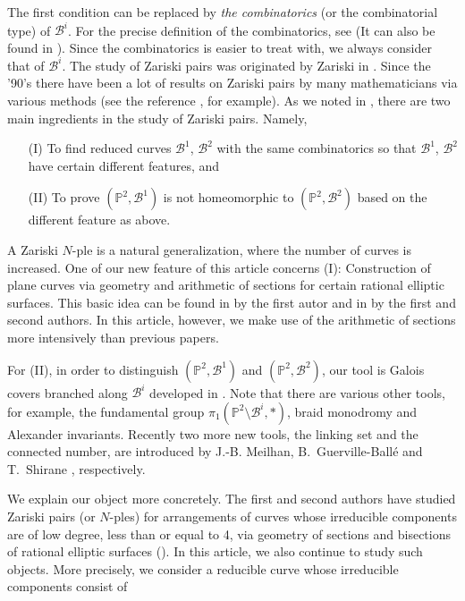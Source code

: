 \documentclass{article}
\newcommand{\PP}{\mathbb P}
\newcommand{\mcB}{\mathcal B}
\begin{document}
The first condition can be replaced by {\it the combinatorics} (or {the combinatorial type}) of $\mcB^i$. For the precise definition
of the combinatorics,  see \cite{act} (It can also be found in \cite{tokunaga14}).  Since the combinatorics is easier to
treat with, we always consider that of $\mcB^i$.
The study of Zariski pairs was originated by Zariski in \cite{zariski29}. Since the '90's there have been
a lot of results on Zariski pairs by many mathematicians via various methods (see the reference \cite{act},
for example).
As we noted in \cite{act}, there are two main ingredients in the study of Zariski pairs.
Namely,
\begin{enumerate}

\item[(I)] To find reduced curves $\mcB^1$, $\mcB^2$ with the same combinatorics so that $\mcB^1$, $\mcB^2$ have
certain different features, and

\item[(II)] To prove $(\PP^2, \mcB^1)$ is not homeomorphic to $(\PP^2, \mcB^2)$ based on the different feature as above.

\end{enumerate}

A Zariski $N$-ple is a natural generalization, where the number of curves is increased.
One of our new feature of this article concerns   (I): Construction of plane curves via geometry and arithmetic 
of sections for certain rational elliptic surfaces. This basic idea can be found in
\cite{tokunaga14} by the first autor  and in \cite{bannai-tokunaga}  by the first and second authors. 
In this article, however,
we make use of the arithmetic of sections more intensively than previous papers.

For (II), in order to distinguish $(\PP^2, \mcB^1)$ and $(\PP^2, \mcB^2)$, our tool  is Galois covers
 branched along $\mcB^i$  developed in \cite{bannai-tokunaga, tokunaga14}.  
Note that there are
various other tools, for example, 
the fundamental group $\pi_1(\PP^2\setminus\mcB^i, \ast)$, braid monodromy and Alexander invariants.
Recently two more new tools, the linking set and the connected number,  are introduced
by J.-B. Meilhan, B.~Guerville-Ball\'{e} \cite{benoit-jb} and T.~Shirane \cite{shirane16}, respectively.

 We explain our object more concretely.
  The first and second authors have studied Zariski pairs (or $N$-ples) for arrangements of curves whose
 irreducible components are of low degree, less than or equal to 4, via geometry of sections and bisections of
 rational elliptic surfaces (\cite{bannai-tokunaga, tokunaga14}).  In this article, we also continue to study such objects. More precisely, we consider
 a reducible curve whose irreducible components consist of 
 
\end{document}
